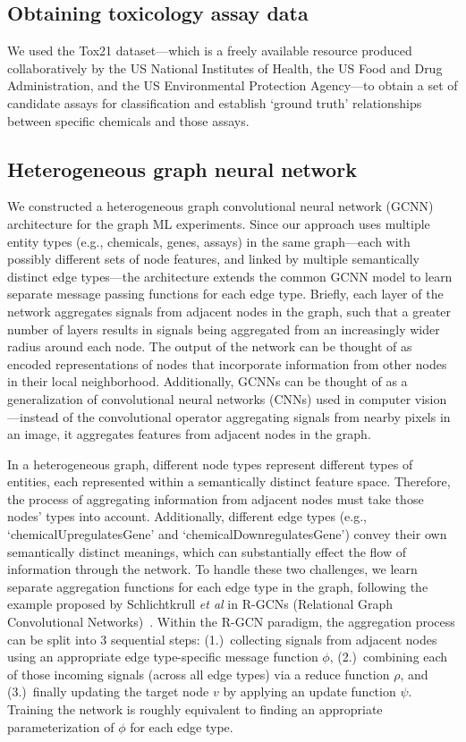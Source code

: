 \documentclass{ws-procs11x85}
\begin{document}
\subsection{Obtaining toxicology assay data}
We used the Tox21 dataset---which is a freely available resource produced collaboratively by the US National Institutes of Health, the US Food and Drug Administration, and the US Environmental Protection Agency---to obtain a set of candidate assays for classification and establish `ground truth' relationships between specific chemicals and those assays.

\subsection{Heterogeneous graph neural network}
We constructed a heterogeneous graph convolutional neural network (GCNN) architecture for the graph ML experiments.
Since our approach uses multiple entity types (e.g., chemicals, genes, assays) in the same graph---each with possibly different sets of node features, and linked by multiple semantically distinct edge types---the architecture extends the common GCNN model to learn separate message passing functions for each edge type.
Briefly, each layer of the network aggregates signals from adjacent nodes in the graph, such that a greater number of layers results in signals being aggregated from an increasingly wider radius around each node.
The output of the network can be thought of as encoded representations of nodes that incorporate information from other nodes in their local neighborhood.
Additionally, GCNNs can be thought of as a generalization of convolutional neural networks (CNNs) used in computer vision---instead of the convolutional operator aggregating signals from nearby pixels in an image, it aggregates features from adjacent nodes in the graph.

In a heterogeneous graph, different node types represent different types of entities, each represented within a semantically distinct feature space.
Therefore, the process of aggregating information from adjacent nodes must take those nodes' types into account.
Additionally, different edge types (e.g., `chemicalUpregulatesGene' and `chemicalDownregulatesGene') convey their own semantically distinct meanings, which can substantially effect the flow of information through the network.
To handle these two challenges, we learn separate aggregation functions for each edge type in the graph, following the example proposed by Schlichtkrull \textit{et al} in R-GCNs (Relational Graph Convolutional Networks)~\cite{schlichtkrull2018modeling}.
Within the R-GCN paradigm, the aggregation process can be split into 3 sequential steps: (1.)~collecting signals from adjacent nodes using an appropriate edge type-specific message function $\phi$, (2.)~combining each of those incoming signals (across all edge types) via a reduce function $\rho$, and (3.)~finally updating the target node $v$ by applying an update function $\psi$.
Training the network is roughly equivalent to finding an appropriate parameterization of $\phi$ for each edge type.
\end{document}
